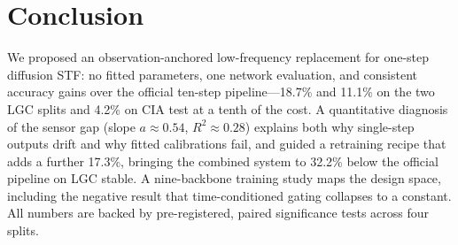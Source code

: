 \documentclass{article}
\begin{document}
\section{Conclusion}
\label{sec:concl}
We proposed an observation-anchored low-frequency replacement for one-step diffusion STF: no fitted parameters, one network evaluation, and consistent accuracy gains over the official ten-step pipeline---18.7\% and 11.1\% on the two LGC splits and 4.2\% on CIA test at a tenth of the cost. A quantitative diagnosis of the sensor gap (slope $a\approx0.54$, $R^2\approx0.28$) explains both why single-step outputs drift and why fitted calibrations fail, and guided a retraining recipe that adds a further 17.3\%, bringing the combined system to 32.2\% below the official pipeline on LGC stable. A nine-backbone training study maps the design space, including the negative result that time-conditioned gating collapses to a constant. All numbers are backed by pre-registered, paired significance tests across four splits.



\end{document}
